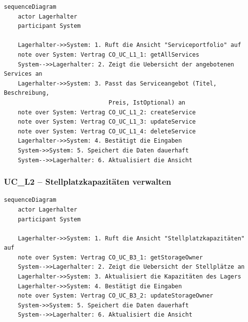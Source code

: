 \begin{lstlisting}[basicstyle=\ttfamily\small, breaklines=true]
sequenceDiagram
    actor Lagerhalter
    participant System

    Lagerhalter->>System: 1. Ruft die Ansicht "Serviceportfolio" auf
    note over System: Vertrag CO_UC_L1_1: getAllServices
    System-->>Lagerhalter: 2. Zeigt die Uebersicht der angebotenen Services an
    Lagerhalter->>System: 3. Passt das Serviceangebot (Titel, Beschreibung,
                              Preis, IstOptional) an
    note over System: Vertrag CO_UC_L1_2: createService
    note over System: Vertrag CO_UC_L1_3: updateService
    note over System: Vertrag CO_UC_L1_4: deleteService
    Lagerhalter->>System: 4. Bestätigt die Eingaben
    System->>System: 5. Speichert die Daten dauerhaft
    System-->>Lagerhalter: 6. Aktualisiert die Ansicht
\end{lstlisting}

\newpage

{}
\subsubsection*{UC\_L2 – Stellplatzkapazit\"{a}ten verwalten}

\begin{lstlisting}[basicstyle=\ttfamily\small, breaklines=true]
sequenceDiagram
    actor Lagerhalter
    participant System

    Lagerhalter->>System: 1. Ruft die Ansicht "Stellplatzkapazitäten" auf
    note over System: Vertrag CO_UC_B3_1: getStorageOwner
    System-->>Lagerhalter: 2. Zeigt die Uebersicht der Stellplätze an
    Lagerhalter->>System: 3. Aktualisiert die Kapazitäten des Lagers
    Lagerhalter->>System: 4. Bestätigt die Eingaben
    note over System: Vertrag CO_UC_B3_2: updateStorageOwner
    System->>System: 5. Speichert die Daten dauerhaft
    System-->>Lagerhalter: 6. Aktualisiert die Ansicht
\end{lstlisting}

\newpage

{}
